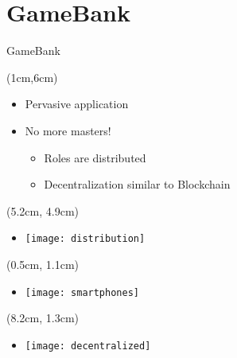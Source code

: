 \section{GameBank}
\begin{frame}{GameBank}
  
  \begin{textblock*}{10cm}(1cm,6cm)
   \begin{itemize}
   \item<1-> Pervasive application
   \item<2-> No more masters!
   \begin{itemize}
    \item<3-> Roles are distributed
    \item<4-> Decentralization similar to Blockchain
   \end{itemize}
  \end{itemize}
  \end{textblock*}
  
  \begin{textblock*}{5cm}(5.2cm, 4.9cm)
  \begin{itemize}
   \item[]<3-> \texttt{[image: distribution]}
  \end{itemize}

  \end{textblock*}
  
  \begin{textblock*}{5cm}(0.5cm, 1.1cm)
  \begin{itemize}
   \item[]<1-> \texttt{[image: smartphones]}
  \end{itemize}
  \end{textblock*}
  
  \begin{textblock*}{5cm}(8.2cm, 1.3cm)
  \begin{itemize}
   \item[]<4-> \texttt{[image: decentralized]}
  \end{itemize}
  \end{textblock*}



\end{frame}
